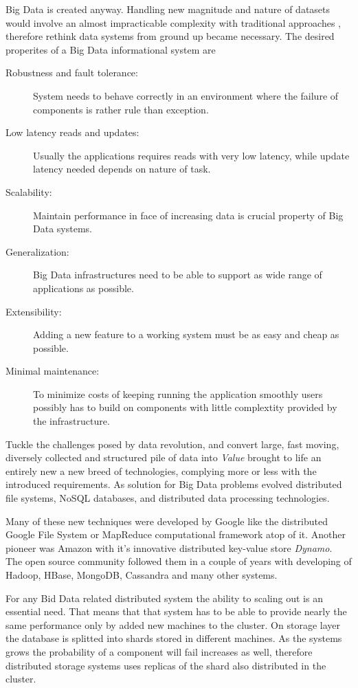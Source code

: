 Big Data is created anyway. Handling new magnitude and nature of datasets would involve an almost impracticable complexity with traditional approaches ,
 therefore rethink data systems from ground up became necessary. The desired properites of a Big Data informational system\cite{marz} are
 \begin{description}
\item[Robustness and fault tolerance:] System needs to behave correctly in an environment where the failure of components is rather rule than exception.
\item[Low latency reads and updates:] Usually the applications requires reads with very low latency, while update latency needed depends on nature of task.
\item[Scalability:] Maintain performance in face of increasing data is crucial property of Big Data systems. 
\item[Generalization:] Big Data infrastructures need to be able to support as wide range of applications as possible.
\item[Extensibility:] Adding a new feature to a working system must be as easy and cheap as possible.
\item[Minimal maintenance:] To minimize costs of keeping running the application smoothly users possibly has to build on components with little 
complextity provided by the infrastructure.
 \end{description}
Tuckle the challenges posed by data revolution, and convert large, fast moving, diversely collected and structured pile of data into \textit{Value} brought to life an entirely new a new breed of technologies, complying more or less with the introduced requirements. 
As solution for Big Data problems evolved distributed file systems, NoSQL databases, and distributed data processing technologies. 

Many of these new techniques were developed by Google like the distributed Google File System\cite{gfs} or MapReduce\cite{mapreduce} computational framework atop of it. 
Another pioneer was Amazon with it's innovative distributed key-value store \textit{Dynamo}. The open source community followed them in a couple of years with 
developing of Hadoop, HBase, MongoDB, Cassandra and many other systems.

For any Bid Data related distributed system the ability to scaling out is an essential need. That means that that system has to be able to provide nearly the same performance 
only by added new machines to the cluster. On storage layer the database is splitted into shards stored in different machines. As the systems grows the probability of a component will fail increases as well, 
therefore distributed storage systems uses replicas of the shard also distributed in the cluster.

